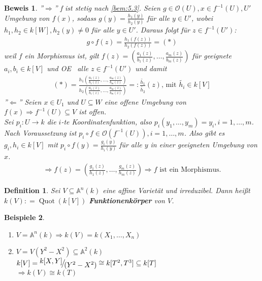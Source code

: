 \documentclass[a4paper,12pt]{report}
\theoremstyle{break}
\newtheorem{Def}{Definition}[section]
\newtheorem{Bsp}[Def]{Beispiele}
\theoremstyle{nonumberbreak}
\theoremstyle{nonumberplain}
\newtheorem{Bew}{Beweis}
\newcommand{\emp}[1]{\textbf{\emph{#1}}}
\newcommand{\begriff}[1]{{\index{#1}}\emp{#1}}
\newcommand{\defeqr}[0]{\mathrel{\mathop:}=}
\newcommand{\defeql}[0]{=\mathrel{\mathop:}}
\DeclareMathOperator{\Quot}{Quot}
\newcommand{\FakRaum}[2]{
  \raisebox{0.7ex}{\ensuremath{#1}}
  \ensuremath{\mkern-3mu}\big/\ensuremath{\mkern-3mu}
  \raisebox{-0.6ex}{\ensuremath{#2}}}
\renewcommand{\OE}{O\!\!E}
\begin{document}
\begin{Bew}
  ''$\Rightarrow$'' f ist stetig nach \ref{bem:5.3}. 
  Seien $g\in\mathcal O(U), x\in f^{-1}(U), U'$ Umgebung von $f(x)$, sodass $g(y)=\frac{h_1(y)}{h_2(y)}$ für alle $y\in U'$, wobei $h_1,h_2\in k[W], h_2(y)\neq 0$ für alle $y\in U'$. Daraus folgt für $z\in f^{-1}(U')$:
  \begin{align*}
    g\circ f(z)=\frac{h_1(f(z))}{h_2(f(z))}=(*)
  \end{align*}
  weil $f$ ein Morphismus ist, gilt $f(z)=\left(\frac{a_1(z)}{b_1(z)},\dots,\frac{a_m(z)}{b_m(z)}\right)$ für geeignete $a_i,b_i\in k[V]$ und \OE~  alle $z\in f^{-1}(U')$ und damit
  \begin{align*}
    (*)=\frac{h_1\left(\frac{a_1(z)}{b_1(z)},\dots,\frac{a_m(z)}{b_m(z)}\right)}{h_2\left(\frac{a_1(z)}{b_1(z)},\dots,\frac{a_m(z)}{b_m(z)}\right)}\defeql\frac{\tilde{ h_1}}{\tilde{h_2}}(z)\text{, mit } \tilde{h_i}\in k[V]
  \end{align*}
  ''$\Leftarrow$'' Seien $x\in U_1$ und $U\subseteq W$ eine offene Umgebung von $f(x)\Rightarrow f^{-1}(U)\subseteq V$ ist offen. \\
  Sei $p_i:U\longrightarrow k$ die $i$-te Koordinatenfunktion, also $p_i(y_1,\dots,y_m)=y_i, i=1,\dots,m$. Nach Voraussetzung ist $p_i\circ f\in\mathcal O(f^{-1}(U)), i=1,\dots,m$. Also gibt es $g_i, h_i \in k[V]$ mit $p_i\circ f(y)=\frac{g_i(y)}{h_i(y)}$ für alle $y$ in einer geeigneten Umgebung von $x$.
  \begin{align*}
    \Rightarrow f(z)=\left(\frac{g_1(z)}{h_1(z)},\dots,\frac{g_m(z)}{h_m(z)}\right) \Rightarrow f \text{ ist ein Morphismus.}
  \end{align*}
\end{Bew}
\begin{Def}
  \label{def:6.7}
  Sei $V\subseteq\mathbb A^n(k)$ eine affine Varietät und irreduzibel. Dann heißt $k(V)\defeqr\Quot(k[V])$ \begriff{Funktionenkörper} von $V$.
\end{Def}
\begin{Bsp}
  \begin{enumerate}
  \item $V=\mathbb A^n(k)\Rightarrow k(V)=k(X_1,\dots,X_n)$ \\
  \item $V=V(Y^2-X^2)\subseteq\mathbb A^2(k)$ \\
    $k[V]=\FakRaum{k[X,Y]}{(Y^2-X^2)}\cong k[T^2,T^3]\subseteq k[T]$ \\
    $\Rightarrow k(V)\cong k(T)$
  \end{enumerate}
\end{Bsp}
\end{document}
